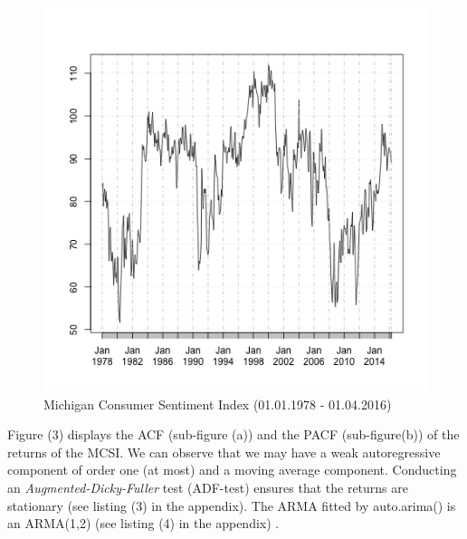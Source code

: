 \documentclass[fleqn]{article}
\begin{document}
\begin{figure}[!htb]
\centering
	\includegraphics[width=\textwidth]{p2.png}
\caption{Michigan Consumer Sentiment Index (01.01.1978 - 01.04.2016) }
\end{figure}
\pagebreak
Figure (3) displays the ACF (sub-figure (a)) and the PACF (sub-figure(b)) of the returns of the MCSI. We can observe that we may have a weak autoregressive component of order one (at most) and a moving average component.  Conducting an \textit{Augmented-Dicky-Fuller} test (ADF-test) ensures that the returns are stationary (see listing (3) in the appendix). The ARMA fitted by auto.arima() is an ARMA(1,2) (see listing (4) in the appendix) .
\end{document}

